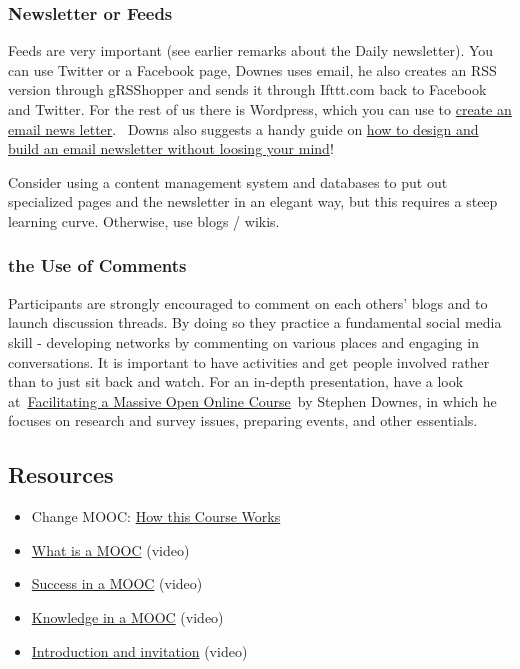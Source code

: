 \hypertarget{newsletter-or-feeds}{%
\subsubsection{Newsletter or Feeds}\label{newsletter-or-feeds}}

Feeds are very important (see earlier remarks about the Daily
newsletter). You can use Twitter or a Facebook page, Downes uses email,
he also creates an RSS version through gRSShopper and sends it through
Ifttt.com back to Facebook and Twitter. For the rest of us there is
Wordpress, which you can use to
\href{http://www.wpbeginner.com/wp-tutorials/create-a-free-email-newsletter-service-using-wordpress/\%20}{create
an email news letter}.~ Downs also suggests a handy guide on
\href{http://www.smashingmagazine.com/2010/01/19/design-and-build-an-email-newsletter-without-losing-your-mind/}{how
to design and build an email newsletter without loosing your mind}!

Consider using a content management system and databases to put out
specialized pages and the newsletter in an elegant way, but this
requires a steep learning curve. Otherwise, use blogs / wikis.

\hypertarget{the-use-of-comments}{%
\subsubsection{the Use of Comments}\label{the-use-of-comments}}

Participants are strongly encouraged to comment on each others' blogs
and to launch discussion threads. By doing so they practice a
fundamental social media skill - developing networks by commenting on
various places and engaging in conversations. It is important to have
activities and get people involved rather than to just sit back and
watch. For an in-depth presentation, have a look
at~\href{http://www.downes.ca/presentation/290}{Facilitating a Massive
Open Online Course}~by Stephen Downes, in which he focuses on research
and survey issues, preparing events, and other essentials.

\hypertarget{resources}{%
\subsection{Resources}\label{resources}}

\begin{itemize}
\tightlist
\item
  Change MOOC: \href{http://change.mooc.ca/how.htm}{How this Course
  Works}
\item
  \href{http://www.youtube.com/watch?v=eW3gMGqcZQc}{What is a MOOC}
  (video)
\item
  \href{http://www.youtube.com/watch?v=r8avYQ5ZqM0}{Success in a MOOC}
  (video)
\item
  \href{http://www.youtube.com/watch?v=bWKdhzSAAG0}{Knowledge in a MOOC}
  (video)
\item
  \href{http://www.youtube.com/watch?v=mqnyhLfNH3I}{Introduction and
  invitation} (video)
\end{itemize}
